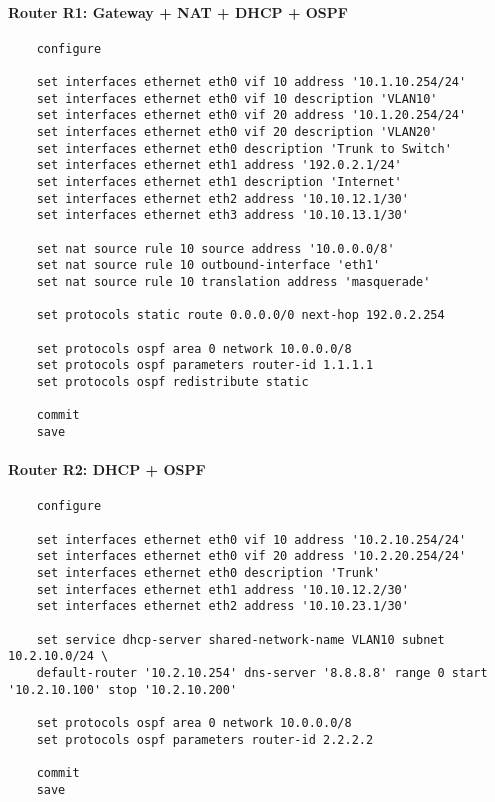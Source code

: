 \paragraph{Router R1: Gateway + NAT + DHCP + OSPF}
\begin{verbatim}
    configure
    
    set interfaces ethernet eth0 vif 10 address '10.1.10.254/24'
    set interfaces ethernet eth0 vif 10 description 'VLAN10'
    set interfaces ethernet eth0 vif 20 address '10.1.20.254/24'
    set interfaces ethernet eth0 vif 20 description 'VLAN20'
    set interfaces ethernet eth0 description 'Trunk to Switch'
    set interfaces ethernet eth1 address '192.0.2.1/24'
    set interfaces ethernet eth1 description 'Internet'
    set interfaces ethernet eth2 address '10.10.12.1/30'
    set interfaces ethernet eth3 address '10.10.13.1/30'
    
    set nat source rule 10 source address '10.0.0.0/8'
    set nat source rule 10 outbound-interface 'eth1'
    set nat source rule 10 translation address 'masquerade'
    
    set protocols static route 0.0.0.0/0 next-hop 192.0.2.254
    
    set protocols ospf area 0 network 10.0.0.0/8
    set protocols ospf parameters router-id 1.1.1.1
    set protocols ospf redistribute static
    
    commit
    save
\end{verbatim}

\vspace{0.3cm}
\paragraph{Router R2: DHCP + OSPF}
\begin{verbatim}
    configure
    
    set interfaces ethernet eth0 vif 10 address '10.2.10.254/24'
    set interfaces ethernet eth0 vif 20 address '10.2.20.254/24'
    set interfaces ethernet eth0 description 'Trunk'
    set interfaces ethernet eth1 address '10.10.12.2/30'
    set interfaces ethernet eth2 address '10.10.23.1/30'
    
    set service dhcp-server shared-network-name VLAN10 subnet 10.2.10.0/24 \
    default-router '10.2.10.254' dns-server '8.8.8.8' range 0 start '10.2.10.100' stop '10.2.10.200'
    
    set protocols ospf area 0 network 10.0.0.0/8
    set protocols ospf parameters router-id 2.2.2.2
    
    commit
    save
\end{verbatim}

